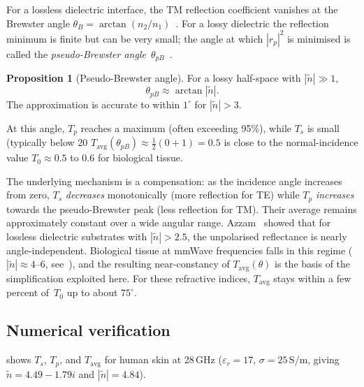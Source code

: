 \documentclass[11pt,a4paper]{article}
\theoremstyle{definition}      %
\newtheorem{proposition}[proposition]{Proposition}
\newcommand{\Tavg}{T_{\mathrm{avg}}}
\newcommand{\ntilde}{\tilde{n}}
\begin{document}
For a lossless dielectric interface, the TM reflection coefficient
vanishes at the Brewster angle
$\theta_B=\arctan(n_2/n_1)$~\cite{BornWolf1999}.  For a lossy
dielectric the reflection minimum is finite but can be very
small; the angle at which $|r_p|^2$ is minimised is called the
\emph{pseudo-Brewster angle}~$\theta_{pB}$~\cite{Potter1970,Ohman1977}.

\begin{proposition}[Pseudo-Brewster angle]\label{prop:pB}
For a lossy half-space with $|\ntilde|\gg 1$,
\begin{equation}\label{eq:theta-pB}
  \theta_{pB} \approx \arctan|\ntilde|.
\end{equation}
The approximation is accurate to within $1^\circ$ for $|\ntilde|>3$.
\end{proposition}

At this angle, $T_p$ reaches a maximum (often exceeding 95\%), while
$T_s$ is small (typically below 20%
$\Tavg(\theta_{pB})\approx\frac{1}{2}(0+1)=0.5$ is close to the
normal-incidence value $T_0\approx 0.5$ to $0.6$ for biological tissue.

The underlying mechanism is a compensation: as the incidence angle
increases from zero, $T_s$ \emph{decreases} monotonically (more
reflection for TE) while $T_p$ \emph{increases} towards the
pseudo-Brewster peak (less reflection for TM).  Their average remains
approximately constant over a wide angular range.
Azzam~\cite{Azzam2015} showed that for lossless dielectric substrates
with $|\ntilde|>2.5$, the unpolarised reflectance is nearly
angle-independent.  Biological tissue at mmWave frequencies falls in
this regime ($|\ntilde|\approx 4$--6,
see~\cite{Gabriel1996,AlekseevZiskin2007}), and the resulting
near-constancy of $\Tavg(\theta)$ is the basis of the simplification
exploited here.  For these refractive indices, $\Tavg$ stays within a
few percent of~$T_0$ up to about $75^\circ$.

\subsection{Numerical verification}\label{sec:pB-numerics}

 shows $T_s$, $T_p$, and $\Tavg$ for human
skin at 28\,GHz ($\varepsilon_r=17$, $\sigma=25$\,S/m, giving
$\ntilde=4.49-1.79i$ and $|\ntilde|=4.84$).
\end{document}

